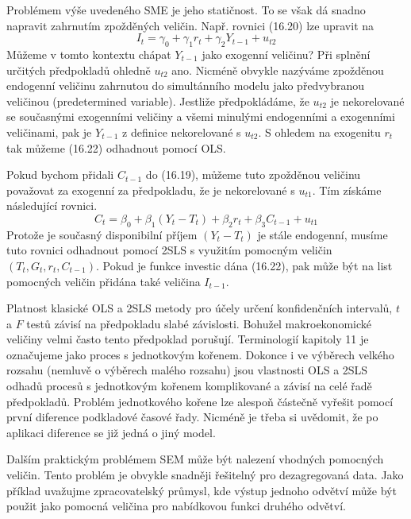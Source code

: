 Problémem výše uvedeného SME je jeho statičnost. To se však dá snadno napravit zahrnutím zpožděných veličin. Např. rovnici (16.20) lze upravit na
\begin{equation}
I_t = \gamma_0 + \gamma_1 r_t + \gamma_2 Y_{t - 1} + u_{t2}
\end{equation}
Můžeme v tomto kontextu chápat $Y_{t-1}$ jako exogenní veličinu? Při splnění určitých předpokladů ohledně $u_{t2}$ ano. Nicméně obvykle nazýváme zpožděnou endogenní veličinu zahrnutou do simultánního modelu jako předvybranou veličinou (predetermined variable). Jestliže předpokládáme, že $u_{t2}$ je nekorelované se současnými exogenními veličiny a všemi minulými endogenními a exogenními veličinami, pak je $Y_{t-1}$ z definice nekorelované s $u_{t2}$. S ohledem na exogenitu $r_t$ tak můžeme (16.22) odhadnout pomocí OLS.

Pokud bychom přidali $C_{t-1}$ do (16.19), můžeme tuto zpožděnou veličinu považovat za exogenní za předpokladu, že je nekorelované s $u_{t1}$. Tím získáme následující rovnici.
\begin{equation}
C_t = \beta_0 + \beta_1 (Y_t - T_t) + \beta_2 r_t + \beta_3 C_{t - 1} + u_{t1}
\end{equation}
Protože je současný disponibilní příjem $(Y_t - T_t)$ je stále endogenní, musíme tuto rovnici odhadnout pomocí 2SLS s využitím pomocným veličin $(T_t, G_t, r_t, C_{t-1})$. Pokud je funkce investic dána (16.22), pak může být na list pomocných veličin přidána také veličina $I_{t-1}$.

Platnost klasické OLS a 2SLS metody pro účely určení konfidenčních intervalů, $t$ a $F$ testů závisí na předpokladu slabé závislosti. Bohužel makroekonomické veličiny velmi často tento předpoklad porušují. Terminologií kapitoly 11 je označujeme jako proces s jednotkovým kořenem. Dokonce i ve výběrech velkého rozsahu (nemluvě o výběrech malého rozsahu) jsou vlastnosti OLS a 2SLS odhadů procesů s jednotkovým kořenem komplikované a závisí na celé řadě předpokladů. Problém jednotkového kořene lze alespoň částečně vyřešit pomocí první diference podkladové časové řady. Nicméně je třeba si uvědomit, že po aplikaci diference se již jedná o jiný model.

Dalším praktickým problémem SEM může být nalezení vhodných pomocných veličin. Tento problém je obvykle snadněji řešitelný pro dezagregovaná data. Jako příklad uvažujme zpracovatelský průmysl, kde výstup jednoho odvětví může být použit jako pomocná veličina pro nabídkovou funkci druhého odvětví.

